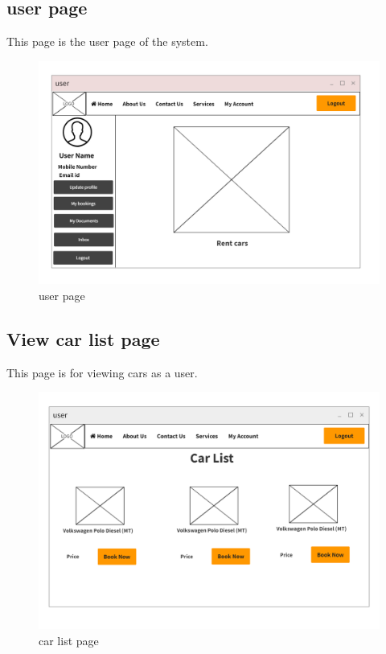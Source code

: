 \documentclass[a4paper,12pt,toc=flat]{report}
\begin{document}
	\pagebreak
	
	
	
		\subsection{user page}
\hspace*{12pt}
	This page is the user page of the system.
	\begin{figure}[bph]
	\begin{center}
		\includegraphics[width=1.1 \linewidth, height=0.7\textheight]{"user.png"}
	\end{center}
		\caption{ user page}
	\end{figure}

	\pagebreak
	
		\subsection{View car list page}
\hspace*{12pt}
	This page is for viewing cars as a user.
	\begin{figure}[bph]
	\begin{center}
		\includegraphics[width=1.1 \linewidth, height=0.7\textheight]{"user_carlist.png"}
	\end{center}
		\caption{ car list page}
	\end{figure}
\end{document}
